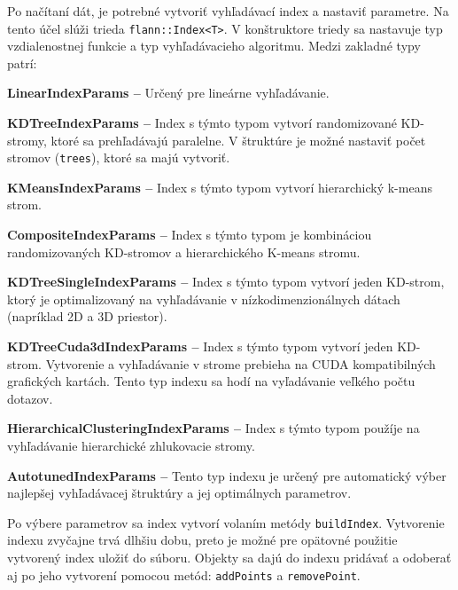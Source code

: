 \documentclass[12pt,a4paper,oneside]{fithesis2}
\begin{document}
	Po načítaní dát, je potrebné vytvoriť vyhľadávací index a nastaviť parametre. Na tento účel slúži trieda \texttt{flann::Index<T>}. V konštruktore triedy sa nastavuje typ vzdialenostnej funkcie a typ vyhľadávacieho algoritmu. Medzi zakladné typy patrí:
	\begin{description}
	\item \textbf{LinearIndexParams --} Určený pre lineárne vyhľadávanie.
	
	\item \textbf{KDTreeIndexParams --} Index s týmto typom vytvorí randomizované KD-stromy, ktoré sa prehľadávajú paralelne. V štruktúre je možné nastaviť počet stromov (\texttt{trees}), ktoré sa majú vytvoriť. 

	\item \textbf{KMeansIndexParams --} Index s týmto typom vytvorí hierarchický k-means strom.

	\item \textbf{CompositeIndexParams --} Index s týmto typom je kombináciou randomizovaných KD-stromov a hierarchického K-means stromu. 

	\item \textbf{KDTreeSingleIndexParams --} Index s týmto typom vytvorí jeden KD-strom, ktorý je optimalizovaný na vyhľadávanie v nízkodimenzionálnych dátach (napríklad 2D a 3D priestor).

	\item \textbf{KDTreeCuda3dIndexParams --} Index s týmto typom vytvorí jeden KD-strom. Vytvorenie a vyhľadávanie v strome prebieha na CUDA kompatibilných grafických kartách. Tento typ indexu sa hodí na vyľadávanie veľkého počtu dotazov.
	
	\item \textbf{HierarchicalClusteringIndexParams --} Index s týmto typom použíje na vyhľadávanie hierarchické zhlukovacie stromy.

	\item \textbf{AutotunedIndexParams --} Tento typ indexu je určený pre automatický výber najlepšej vyhľadávacej štruktúry a jej optimálnych parametrov.
	
	\end{description}

Po výbere parametrov sa index vytvorí volaním metódy \texttt{buildIndex}. Vytvorenie indexu zvyčajne trvá dlhšiu dobu, preto je možné pre opätovné použitie vytvorený index uložiť do súboru.
Objekty sa dajú do indexu pridávať a odoberať aj po jeho vytvorení pomocou metód: \texttt{addPoints} a \texttt{removePoint}. 
\end{document}
